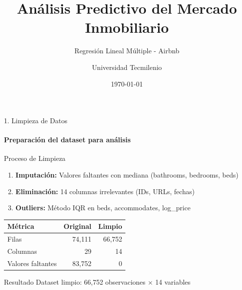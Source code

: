 \documentclass{beamer}
\title{Análisis Predictivo del Mercado Inmobiliario}
\subtitle{Regresión Lineal Múltiple - Airbnb}
\author{Universidad Tecmilenio}
\date{\today}
\begin{document}
\begin{frame}
  \titlepage
\end{frame}

\begin{frame}{1. Limpieza de Datos}
  \framesubtitle{Preparación del dataset para análisis}
  
  \begin{block}{Proceso de Limpieza}
    \begin{enumerate}
      \item \textbf{Imputación:} Valores faltantes con mediana (bathrooms, bedrooms, beds)
      \item \textbf{Eliminación:} 14 columnas irrelevantes (IDs, URLs, fechas)
      \item \textbf{Outliers:} Método IQR en beds, accommodates, log\_price
    \end{enumerate}
  \end{block}
  
  \vspace{0.3cm}
  
  \begin{center}
    \begin{tabular}{lrr}
      \toprule
      \textbf{Métrica} & \textbf{Original} & \textbf{Limpio} \\
      \midrule
      Filas & 74,111 & 66,752 \\
      Columnas & 29 & 14 \\
      Valores faltantes & 83,752 & 0 \\
      \bottomrule
    \end{tabular}
  \end{center}
  
  \begin{alertblock}{Resultado}
    Dataset limpio: \alert{66,752 observaciones} × \alert{14 variables}
  \end{alertblock}
\end{frame}
\end{document}
